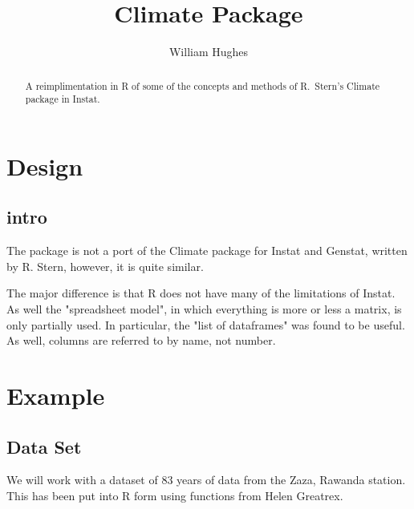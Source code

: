 \documentclass{article}
\title{Climate Package}
\author{William Hughes}
\begin{document}

\maketitle



\begin{abstract}
A reimplimentation in R of some of the
concepts and methods of R.~Stern's 
Climate package in Instat.

\end{abstract}


\section{Design}



\subsection{intro}

The package is not a port of the Climate
package for Instat and Genstat, written by R. Stern,
however, it is quite similar.

The major difference is that R does not have many
of the limitations of Instat.  As well the "spreadsheet
model", in which everything is more or less a matrix,
is only partially used.  In particular, the "list of
dataframes" was found to be useful.  As well, columns are
referred to by name, not number.

\section{Example}

\subsection{Data Set}

We will work with a dataset of 83 years of data from the
Zaza, Rawanda station.  This has been put into R form using
functions from Helen Greatrex.
\end{document}
